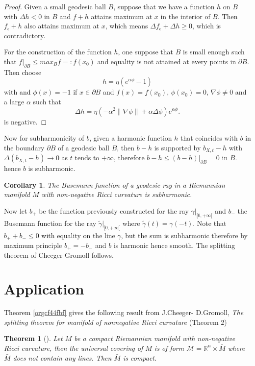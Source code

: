 \documentclass[11pt]{article}
\newtheorem{theorem}{Theorem}
\newtheorem{corollary}{Corollary}[theorem]
\begin{document}
\begin{proof}
Given a small geodesic ball \(B\), suppose that we have a function \(h\) on \(B\) with \(\Delta h <0\) in \(B\) and
\(f+h\) attains maximum at \(x\) in the interior of \(B\). Then \(f_\epsilon + h\) also attains maximum at
\(x\), which means \(\Delta f_\epsilon + \Delta h \geq 0\), which is contradictory.

For the construction of the function \(h\), one suppose that \(B\) is small enough such that
\(f|_{\partial B} \leq max_B f=: f(x_0)\) and equality is not attained at every points in \(\partial B\). Then
choose
\[
h = \eta (e^{\alpha \phi} - 1)
\]
with and \(\phi(x) = -1\) if \(x\in \partial B\) and \(f(x) = f(x_0)\), \(\phi(x_0) = 0\),
\(\nabla \phi \ne 0\) and a large  \(\alpha\) such that
\[
\Delta h = \eta (-\alpha^2\| \nabla \phi\| + \alpha \Delta \phi)e^{\alpha \phi}.
\]
is negative.
\end{proof}


Now for subharmonicity of \(b\), given a harmonic function \(h\) that coincides with \(b\) in the boundary \(\partial B\) of a
geodesic ball \(B\), then \(b-h\) is supported by \(b_{X,t} - h\) with \(\Delta (b_{X,t}-h) \to 0\) as \(t\)
tends to \(+\infty\), therefore \(b-h \leq (b-h)|_{\partial B} = 0\) in \(B\). hence \(b\) is subharmonic.

\begin{corollary}
The Busemann function of a geodesic ray in a Riemannian manifold \(M\) with non-negative Ricci
curvature is subharmonic.
\end{corollary}


Now let \(b_+\) be the function previously constructed for the ray \(\gamma|_{[0,+\infty[}\) and \(b_-\)
the Busemann function for the ray \(\tilde\gamma|_{[0,+\infty[}\) where \(\tilde\gamma(t) =
\gamma(-t)\). Note that \(b_+ + b_-\leq 0\) with equality on the line \(\gamma\), but the sum is
subharmonic therefore by maximum principle \(b_+ = -b_-\) and \(b\) is harmonic hence smooth. The
splitting theorem of Cheeger-Gromoll follows.


\section{Application}
\label{sec:org0721a48}
Theorem \ref{orgcf44fbf} gives the following result from J.Cheeger- D.Gromoll, \emph{The splitting
theorem for manifold of nonnegative Ricci curvature} (Theorem 2)
\begin{theorem}[]
\label{thm:decomp-Ricci-non-negative}
\label{org9a6a6a5}
Let \(M\) be a compact Riemannian manifold with non-negative Ricci curvature, then the universal
covering of \(M\) is of form \(\mathcal{M} = \mathbb{R}^n\times \bar M\) where \(\bar M\) does not contain
any lines. Then \(\bar M\) is compact.
\end{theorem}
\end{document}
